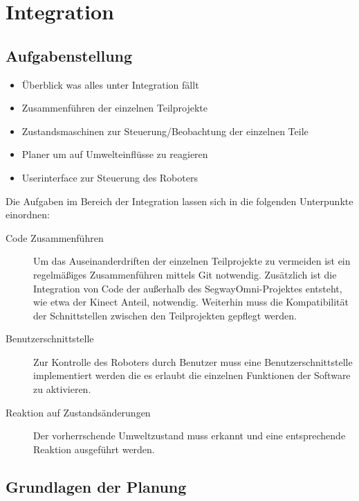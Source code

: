 
\chapter{Integration}
\label{integration_cha}
\authorsection{\editorjulian}

\section{Aufgabenstellung}
\label{aufgabenstellung_integration_sec}

\begin{itemize}
\item Überblick was alles unter Integration fällt
\item Zusammenführen der einzelnen Teilprojekte
\item Zustandsmaschinen zur Steuerung/Beobachtung der einzelnen Teile
\item Planer um auf Umwelteinflüsse zu reagieren
\item Userinterface zur Steuerung des Roboters
\end{itemize}

Die Aufgaben im Bereich der Integration lassen sich in die folgenden Unterpunkte einordnen:

\begin{description}
\item[Code Zusammenführen]
Um das Auseinanderdriften der einzelnen Teilprojekte zu vermeiden ist ein regelmäßiges Zusammenführen mittels Git notwendig. Zusätzlich ist die Integration von Code der außerhalb des SegwayOmni-Projektes entsteht, wie etwa der Kinect Anteil, notwendig. Weiterhin muss die Kompatibilität der Schnittstellen zwischen den Teilprojekten gepflegt werden.

\item[Benutzerschnittstelle]
Zur Kontrolle des Roboters durch Benutzer muss eine Benutzerschnittstelle implementiert werden die es erlaubt die einzelnen Funktionen der Software zu aktivieren.

\item[Reaktion auf Zustandsänderungen]
Der vorherrschende Umweltzustand muss erkannt und eine entsprechende Reaktion ausgeführt werden.
\end{description}




\section{Grundlagen der Planung}
\label{grundlagen_integration_sec}

